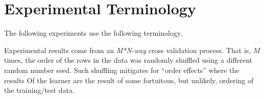 \documentclass[10pt,conference]{IEEEtran}
\newcommand{\bi}{\begin{itemize}}
\newcommand{\ei}{\end{itemize}}
\begin{document}

 

\section{Experimental Terminology}


The following experiments use the following terminology.

Experimental results come from  an {\em M*N-way} cross validation process. That is, $M$ times, the order of the rows in the data 
was  randomly shuffled using a different random number seed.
Such shuffling   mitigates for ``order effects'' where the results
Of the learner are the result of some fortuitous, but unlikely, ordering of the training/test data.  
\end{document}

